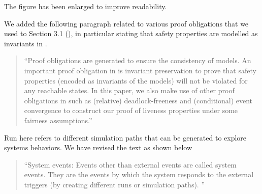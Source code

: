 \documentclass{response}
\begin{document}
\begin{comment}{Reviewer \#1}
• p.15 Fig. 5 is too small. One cannot read its text.
\end{comment}

\begin{response}
  The figure has been enlarged to improve readability.
\end{response}

\begin{comment}{Reviewer \#1}
• p.18 It would have been interesting to state the discussion of the first
paragraph of section 7: Verification of Safety Properties within the
context of the proof obligation generator you have at hand.
\end{comment}

\begin{response}
  We added the following paragraph related to various proof obligations
  that we used to Section 3.1 (\EventB), in particular stating that
  safety properties are modelled as invariants in \EventB.
  \begin{quote}
    ``Proof obligations are generated to ensure the consistency of
  \mbox{\EventB} models.  An important proof obligation in
  \mbox{\EventB} is invariant preservation to prove that safety
  properties (encoded as invariants of the models) will not be violated
  for any reachable states. In this paper, we also make use of other
  proof obligations in \mbox{\EventB} such as (relative)
  deadlock-freeness and (conditional) event convergence to construct
  our proof of liveness properties under some fairness assumptions.''
  \end{quote}
\end{response}

\begin{comment}{Reviewer \#1}
• p.19 Could you precise your notion of run.
\end{comment}

\begin{response}
  Run here refers to different simulation paths that can be generated to explore systems behaviors.
  We have revised the text as shown below
  \begin{quote}
    ``System events: Events other than external events are called system events.
    They are the events by which the system responds to the external triggers (by creating 
    different runs or simulation paths). 
   ''
  \end{quote}
\end{response}
\end{document}
